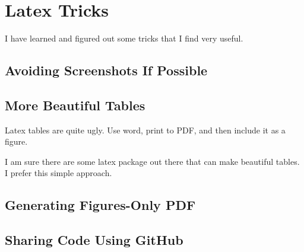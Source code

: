 
\chapter{Latex Tricks}
\label{chapter:tricks}

\thispagestyle{empty}

I have learned and figured out some tricks that I find very useful. 


\minitoc
\newpage





\section{Avoiding Screenshots If Possible}





\section{More Beautiful Tables}

Latex tables are quite ugly. Use word, print to PDF, and then include it as a figure.

I am sure there are some latex package out there that can make beautiful
tables. I prefer this simple approach.




\section{Generating Figures-Only PDF}






\section{Sharing Code Using GitHub}


